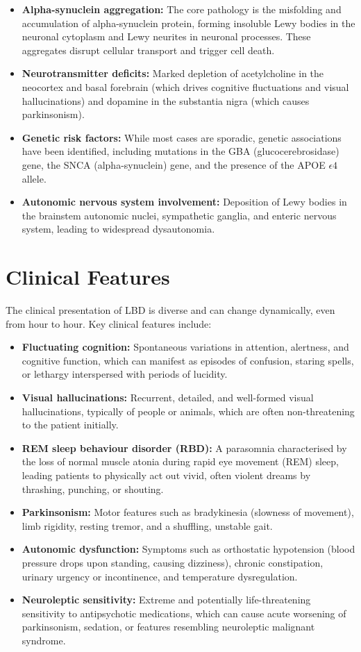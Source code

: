 \begin{itemize}
    \item \textbf{Alpha-synuclein aggregation:} The core pathology is the misfolding and accumulation of alpha-synuclein protein, forming insoluble Lewy bodies in the neuronal cytoplasm and Lewy neurites in neuronal processes. These aggregates disrupt cellular transport and trigger cell death.
    \item \textbf{Neurotransmitter deficits:} Marked depletion of acetylcholine in the neocortex and basal forebrain (which drives cognitive fluctuations and visual hallucinations) and dopamine in the substantia nigra (which causes parkinsonism).
    \item \textbf{Genetic risk factors:} While most cases are sporadic, genetic associations have been identified, including mutations in the GBA (glucocerebrosidase) gene, the SNCA (alpha-synuclein) gene, and the presence of the APOE $\epsilon4$ allele.
    \item \textbf{Autonomic nervous system involvement:} Deposition of Lewy bodies in the brainstem autonomic nuclei, sympathetic ganglia, and enteric nervous system, leading to widespread dysautonomia.
\end{itemize}

\section*{Clinical Features}
The clinical presentation of LBD is diverse and can change dynamically, even from hour to hour. Key clinical features include:

\begin{itemize}
    \item \textbf{Fluctuating cognition:} Spontaneous variations in attention, alertness, and cognitive function, which can manifest as episodes of confusion, staring spells, or lethargy interspersed with periods of lucidity.
    \item \textbf{Visual hallucinations:} Recurrent, detailed, and well-formed visual hallucinations, typically of people or animals, which are often non-threatening to the patient initially.
    \item \textbf{REM sleep behaviour disorder (RBD):} A parasomnia characterised by the loss of normal muscle atonia during rapid eye movement (REM) sleep, leading patients to physically act out vivid, often violent dreams by thrashing, punching, or shouting.
    \item \textbf{Parkinsonism:} Motor features such as bradykinesia (slowness of movement), limb rigidity, resting tremor, and a shuffling, unstable gait.
    \item \textbf{Autonomic dysfunction:} Symptoms such as orthostatic hypotension (blood pressure drops upon standing, causing dizziness), chronic constipation, urinary urgency or incontinence, and temperature dysregulation.
    \item \textbf{Neuroleptic sensitivity:} Extreme and potentially life-threatening sensitivity to antipsychotic medications, which can cause acute worsening of parkinsonism, sedation, or features resembling neuroleptic malignant syndrome.
\end{itemize}

